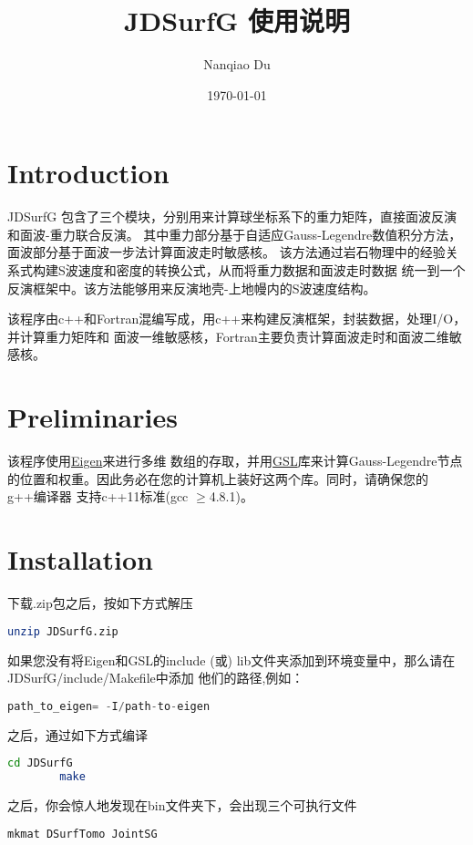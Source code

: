 \documentclass[10p,UTF8]{ctexart}
\title{JDSurfG 使用说明}
\author{Nanqiao Du}
\date{\today}
\begin{document}
   \maketitle
   \tableofcontents
   \newpage
   \section{Introduction}
   JDSurfG 包含了三个模块，分别用来计算球坐标系下的重力矩阵，直接面波反演和面波-重力联合反演。
   其中重力部分基于自适应Gauss-Legendre数值积分方法，面波部分基于面波一步法计算面波走时敏感核。
   该方法通过岩石物理中的经验关系式构建S波速度和密度的转换公式，从而将重力数据和面波走时数据
   统一到一个反演框架中。该方法能够用来反演地壳-上地幔内的S波速度结构。

   该程序由c++和Fortran混编写成，用c++来构建反演框架，封装数据，处理I/O，并计算重力矩阵和
   面波一维敏感核，Fortran主要负责计算面波走时和面波二维敏感核。

   \section{Preliminaries}
   该程序使用\href{http://eigen.tuxfamily.org/index.php?title=Main_Page}{Eigen}来进行多维
   数组的存取，并用\href{http://www.gnu.org/software/gsl/}{GSL}库来计算Gauss-Legendre节点
   的位置和权重。因此务必在您的计算机上装好这两个库。同时，请确保您的g++编译器
   支持c++11标准(gcc $\geq$4.8.1)。

    \section{Installation}
    下载.zip包之后，按如下方式解压
    \begin{lstlisting}[language=bash]
        unzip JDSurfG.zip
    \end{lstlisting}
    如果您没有将Eigen和GSL的include (或) lib文件夹添加到环境变量中，那么请在JDSurfG/include/Makefile中添加
    他们的路径,例如：
    \begin{lstlisting}[language=c]
        path_to_eigen= -I/path-to-eigen
    \end{lstlisting}
    之后，通过如下方式编译
    \begin{lstlisting}[language=bash]
        cd JDSurfG
        make
    \end{lstlisting}
    之后，你会惊人地发现在bin文件夹下，会出现三个可执行文件
    \begin{lstlisting}[language=bash]
       mkmat DSurfTomo JointSG  
    \end{lstlisting}
\end{document}
